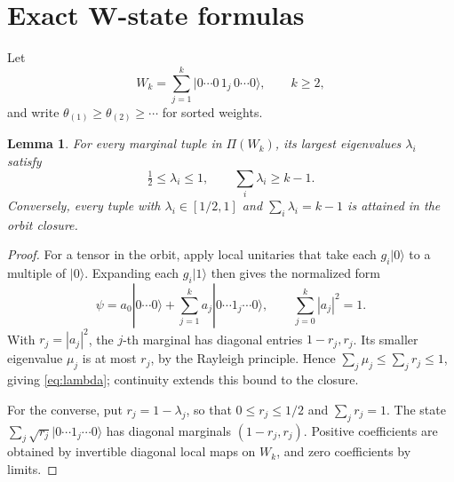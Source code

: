 \documentclass[11pt,a4paper]{article}
\newtheorem{lemma}[theorem]{Lemma}
\newcommand{\ket}[1]{|#1\rangle}
\begin{document}
\section{Exact W-state formulas}
Let
\[
 W_k=\sum_{j=1}^k\ket{0\cdots 0\,1_j\,0\cdots0},\qquad k\ge2,
\]
and write \(\theta_{(1)}\ge\theta_{(2)}\ge\cdots\) for sorted weights.

\begin{lemma}\label{lem:orbit}
For every marginal tuple in \(\Pi(W_k)\), its largest eigenvalues
\(\lambda_i\) satisfy
\begin{equation}
 \tfrac12\le\lambda_i\le1,\qquad \sum_i\lambda_i\ge k-1.
 \label{eq:lambda}
\end{equation}
Conversely, every tuple with \(\lambda_i\in[1/2,1]\) and
\(\sum_i\lambda_i=k-1\) is attained in the orbit closure.
\end{lemma}
\begin{proof}
For a tensor in the orbit, apply local unitaries that take each
\(g_i\ket0\) to a multiple of \(\ket0\). Expanding each \(g_i\ket1\)
then gives the normalized form
\[
 \psi=a_0\ket{0\cdots0}+\sum_{j=1}^ka_j\ket{0\cdots1_j\cdots0},
 \qquad \sum_{j=0}^k|a_j|^2=1.
\]
With \(r_j=|a_j|^2\), the \(j\)-th marginal has diagonal entries
\(1-r_j,r_j\). Its smaller eigenvalue \(\mu_j\) is at most \(r_j\),
by the Rayleigh principle. Hence
\(\sum_j\mu_j\le\sum_jr_j\le1\), giving \eqref{eq:lambda};
continuity extends this bound to the closure.

For the converse, put \(r_j=1-\lambda_j\), so that
\(0\le r_j\le1/2\) and \(\sum_jr_j=1\). The state
\(\sum_j\sqrt{r_j}\ket{0\cdots1_j\cdots0}\) has diagonal marginals
\((1-r_j,r_j)\). Positive coefficients are obtained by invertible
diagonal local maps on \(W_k\), and zero coefficients by limits.
\end{proof}
\end{document}
